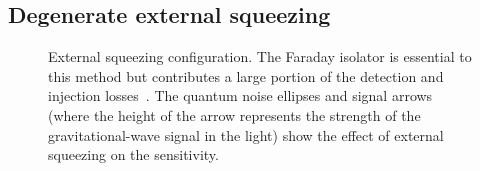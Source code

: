 

\subsection{Degenerate external squeezing}
\label{sec:external_squeezing}

\begin{figure}
	\centering
	\caption{ External squeezing configuration. The Faraday isolator is essential to this method but contributes a large portion of the detection and injection losses~\cite{}. The quantum noise ellipses and signal arrows (where the height of the arrow represents the strength of the gravitational-wave signal in the light) show the effect of external squeezing on the sensitivity.}
	\label{fig:extSqz_config}
\end{figure}



